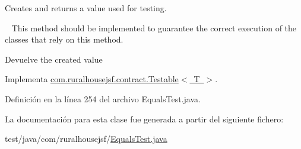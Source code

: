Creates and returns a value used for testing. 

~\newline
 This method should be implemented to guarantee the correct execution of the classes that rely on this method.

\begin{DoxyReturn}{Devuelve}
the created value 
\end{DoxyReturn}


Implementa \mbox{\hyperlink{a00244_ae4546a381488faaba1ef7c0f8688de9c}{com.\+ruralhousejsf.\+contract.\+Testable$<$ T $>$}}.



Definición en la línea 254 del archivo Equals\+Test.\+java.



La documentación para esta clase fue generada a partir del siguiente fichero\+:\begin{DoxyCompactItemize}
\item 
test/java/com/ruralhousejsf/\mbox{\hyperlink{a00092}{Equals\+Test.\+java}}\end{DoxyCompactItemize}
